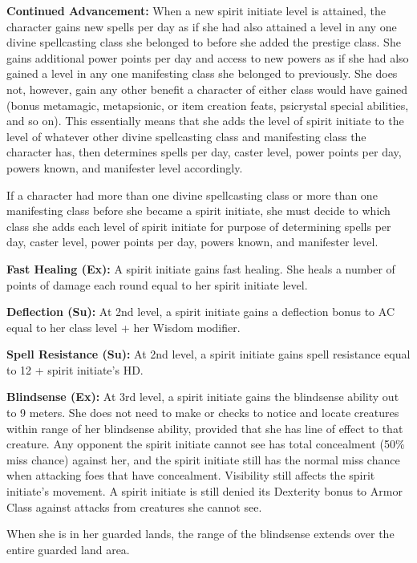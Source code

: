 {
\textbf{Continued Advancement:} When a new spirit initiate level is attained, the character gains new spells per day as if she had also attained a level in any one divine spellcasting class she belonged to before she added the prestige class. She gains additional power points per day and access to new powers as if she had also gained a level in any one manifesting class she belonged to previously. She does not, however, gain any other benefit a character of either class would have gained (bonus metamagic, metapsionic, or item creation feats, psicrystal special abilities, and so on). This essentially means that she adds the level of spirit initiate to the level of whatever other divine spellcasting class and manifesting class the character has, then determines spells per day, caster level, power points per day, powers known, and manifester level accordingly.

If a character had more than one divine spellcasting class or more than one manifesting class before she became a spirit initiate, she must decide to which class she adds each level of spirit initiate for purpose of determining spells per day, caster level, power points per day, powers known, and manifester level.

\textbf{Fast Healing (Ex):} A spirit initiate gains fast healing. She heals a number of points of damage each round equal to her spirit initiate level.

\textbf{Deflection (Su):} At 2nd level, a spirit initiate gains a deflection bonus to AC equal to her class level + her Wisdom modifier.

\textbf{Spell Resistance (Su):} At 2nd level, a spirit initiate gains spell resistance equal to 12 + spirit initiate's HD.

\textbf{Blindsense (Ex):} At 3rd level, a spirit initiate gains the blindsense ability out to 9 meters. She does not need to make  or  checks to notice and locate creatures within range of her blindsense ability, provided that she has line of effect to that creature. Any opponent the spirit initiate cannot see has total concealment (50\% miss chance) against her, and the spirit initiate still has the normal miss chance when attacking foes that have concealment. Visibility still affects the spirit initiate's movement. A spirit initiate is still denied its Dexterity bonus to Armor Class against attacks from creatures she cannot see.

When she is in her guarded lands, the range of the blindsense extends over the entire guarded land area.

}

